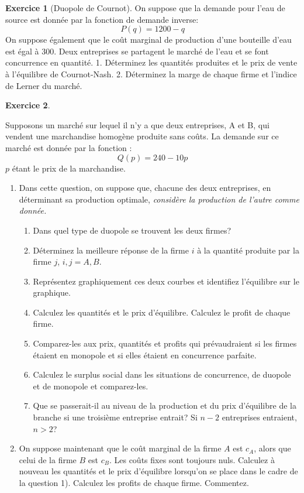 \documentclass[
]{book}
\providecommand{\tightlist}{%
  \setlength{\itemsep}{0pt}\setlength{\parskip}{0pt}}
\theoremstyle{definition}
\theoremstyle{definition}
\theoremstyle{definition}
\newtheorem{exercise}{Exercice}[chapter]
\theoremstyle{definition}
\theoremstyle{remark}
\begin{document}
\begin{exercise}[Duopole de Cournot]
\protect\hypertarget{exr:cournotexo1}{}\label{exr:cournotexo1}On suppose que la demande pour l'eau de source est donnée par la fonction de demande inverse:
\[P(q)=1200-q\]
On suppose également que le coût marginal de production d'une bouteille d'eau est égal à 300. Deux entreprises se partagent le marché de l'eau et se font concurrence en quantité.
1. Déterminez les quantités produites et le prix de vente à l'équilibre de Cournot-Nash.
2. Déterminez la marge de chaque firme et l'indice de Lerner du marché.
\end{exercise}

\begin{exercise}
\protect\hypertarget{exr:cournotexo2}{}\label{exr:cournotexo2}

Supposons un marché sur lequel il n'y a que deux entreprises, A et B, qui vendent une marchandise homogène produite sans coûts. La demande sur ce marché est donnée par la fonction :
\[Q\left(p\right)=240-10p\] \(p\) étant le prix de la marchandise.

\begin{enumerate}
\def\labelenumi{\arabic{enumi}.}
\tightlist
\item
  Dans cette question, on suppose que, chacune des deux entreprises, en déterminant sa production optimale, \emph{considère la production de l'autre comme donnée.}

  \begin{enumerate}
  \def\labelenumii{\alph{enumii}.}
  \tightlist
  \item
    Dans quel type de duopole se trouvent les deux firmes?
  \item
    Déterminez la meilleure réponse de la firme \(i\) à la quantité produite par la firme \(j\), \(i,j=A,B\).
  \item
    Représentez graphiquement ces deux courbes et identifiez l'équilibre sur le graphique.
  \item
    Calculez les quantités et le prix d'équilibre. Calculez le profit de chaque firme.
  \item
    Comparez-les aux prix, quantités et profits qui prévaudraient si les firmes étaient en monopole et si elles étaient en concurrence parfaite.
  \item
    Calculez le surplus social dans les situations de concurrence, de duopole et de monopole et comparez-les.
  \item
    Que se passerait-il au niveau de la production et du prix d'équilibre de la branche si une troisième entreprise entrait? Si \(n-2\) entreprises entraient, \(n>2\)?
  \end{enumerate}
\item
  On suppose maintenant que le coût marginal de la firme \(A\) est \(c_A\), alors que celui de la firme \(B\) est \(c_B\). Les coûts fixes sont toujours nuls.
  Calculez à nouveau les quantités et le prix d'équilibre lorsqu'on se place dans le cadre de la question 1). Calculez les profits de chaque firme. Commentez.
\end{enumerate}

\end{exercise}
\end{document}
